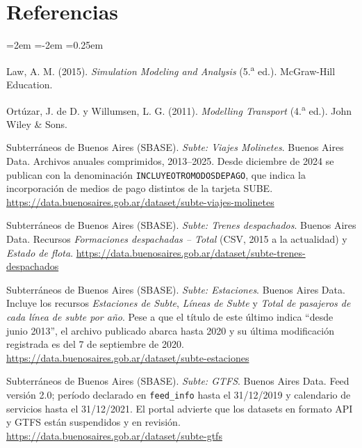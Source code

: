 \documentclass{article}
\begin{document}
\section*{Referencias}
\begin{list}{}{\leftmargin=2em \itemindent=-2em \itemsep=0.25em}

\item[] [1] Law, A. M. (2015). \textit{Simulation Modeling and Analysis} (5.\textsuperscript{a} ed.).
  McGraw-Hill Education.

\item[] [2] Ortúzar, J. de D. y Willumsen, L. G. (2011). \textit{Modelling Transport} (4.\textsuperscript{a}
  ed.). John Wiley \& Sons.

\item[] [3] Subterráneos de Buenos Aires (SBASE). \textit{Subte: Viajes Molinetes}. Buenos Aires Data.
  Archivos anuales comprimidos, 2013--2025. Desde diciembre de 2024 se publican con la denominación
  \texttt{INCLUYEOTROMODOSDEPAGO}, que indica la incorporación de medios de pago distintos de la tarjeta SUBE.
  \url{https://data.buenosaires.gob.ar/dataset/subte-viajes-molinetes}

\item[] [4] Subterráneos de Buenos Aires (SBASE). \textit{Subte: Trenes despachados}. Buenos Aires Data.
  Recursos \textit{Formaciones despachadas -- Total} (CSV, 2015 a la actualidad) y \textit{Estado de flota}.
  \url{https://data.buenosaires.gob.ar/dataset/subte-trenes-despachados}

\item[] [5] Subterráneos de Buenos Aires (SBASE). \textit{Subte: Estaciones}. Buenos Aires Data. Incluye los
  recursos \textit{Estaciones de Subte}, \textit{Líneas de Subte} y \textit{Total de pasajeros de cada línea
  de subte por año}. Pese a que el título de este último indica ``desde junio 2013'', el archivo publicado
  abarca hasta 2020 y su última modificación registrada es del 7 de septiembre de 2020.
  \url{https://data.buenosaires.gob.ar/dataset/subte-estaciones}

\item[] [6] Subterráneos de Buenos Aires (SBASE). \textit{Subte: GTFS}. Buenos Aires Data. Feed versión 2.0;
  período declarado en \texttt{feed\_info} hasta el 31/12/2019 y calendario de servicios hasta el 31/12/2021.
  El portal advierte que los datasets en formato API y GTFS están suspendidos y en revisión.
  \url{https://data.buenosaires.gob.ar/dataset/subte-gtfs}


\end{list}
\end{document}
